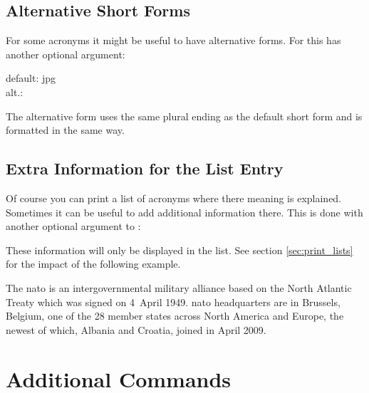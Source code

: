 \documentclass[DIV10,toc=index,toc=bib]{cnpkgdoc}
\begin{document}
\subsection{Alternative Short Forms}
For some acronyms it might be useful to have alternative forms. For this
 has another optional argument:
\begin{beschreibung}
\end{beschreibung}
\begin{beispiel}
 default: \acs{jpg} \\
 alt.: 
\end{beispiel}
The alternative form uses the same plural ending as the default short form and
is formatted in the same way.

\subsection{Extra Information for the List Entry}
Of course you can print a list of acronyms where there meaning is explained.
Sometimes it can be useful to add additional information there. This is done with
another optional argument to :
\begin{beschreibung}
\end{beschreibung}
These information will only be displayed in the list. See section \ref{sec:print_lists}
for the impact of the following example.

\begin{beispiel}
 The \ac{nato} is an intergovernmental military alliance based on the
 North Atlantic Treaty which was signed on 4~April 1949. \ac{nato}
 headquarters are in Brussels, Belgium, one of the 28 member states
 across North America and Europe, the newest of which, Albania and
 Croatia, joined in April 2009.
\end{beispiel}

\section{Additional Commands}
\end{document}
